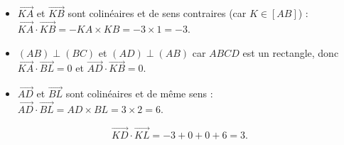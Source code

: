 \documentclass[10pt]{article}
\begin{document}
\begin{enumerate}
\begin{itemize}
  \item $\overrightarrow{KA}$ et $\overrightarrow{KB}$ sont colinéaires et de sens contraires (car $K\in[AB]$) :
        $\overrightarrow{KA}\cdot\overrightarrow{KB}=-KA\times KB=-3\times 1=-3$.
  \item $(AB)\perp(BC)$ et $(AD)\perp(AB)$ car $ABCD$ est un rectangle, donc
        $\overrightarrow{KA}\cdot\overrightarrow{BL}=0$ et $\overrightarrow{AD}\cdot\overrightarrow{KB}=0$.
  \item $\overrightarrow{AD}$ et $\overrightarrow{BL}$ sont colinéaires et de même sens :
        $\overrightarrow{AD}\cdot\overrightarrow{BL}=AD\times BL=3\times 2=6$.
\end{itemize}


\[
\overrightarrow{KD}\cdot\overrightarrow{KL}=-3+0+0+6=3.
\]
\end{enumerate}
\end{document}
